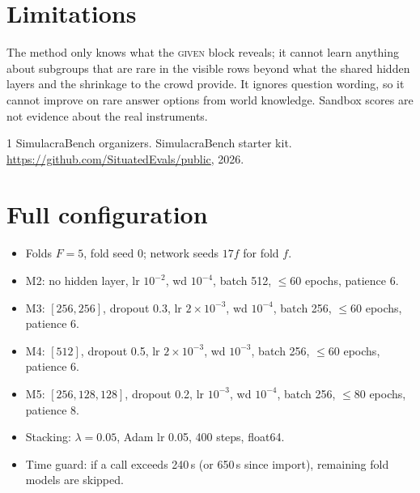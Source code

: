 \documentclass{article}
\begin{document}
\section{Limitations}
\label{sec:limitations}
The method only knows what the \textsc{given} block reveals; it cannot learn anything about subgroups that are rare in the visible rows beyond what the shared hidden layers and the shrinkage to the crowd provide. It ignores question wording, so it cannot improve on rare answer options from world knowledge. Sandbox scores are not evidence about the real instruments.\label{end-of-main}

\begin{thebibliography}{1}
SimulacraBench organizers.
\newblock SimulacraBench starter kit.
\newblock \url{https://github.com/SituatedEvals/public}, 2026.
\end{thebibliography}

\clearpage
\appendix
\section{Full configuration}
\begin{itemize}[leftmargin=*]
  \item Folds $F{=}5$, fold seed 0; network seeds $17f$ for fold $f$.
  \item M2: no hidden layer, lr $10^{-2}$, wd $10^{-4}$, batch 512, $\le$60 epochs, patience 6.
  \item M3: $[256,256]$, dropout 0.3, lr $2\times10^{-3}$, wd $10^{-4}$, batch 256, $\le$60 epochs, patience 6.
  \item M4: $[512]$, dropout 0.5, lr $2\times10^{-3}$, wd $10^{-3}$, batch 256, $\le$60 epochs, patience 6.
  \item M5: $[256,128,128]$, dropout 0.2, lr $10^{-3}$, wd $10^{-4}$, batch 256, $\le$80 epochs, patience 8.
  \item Stacking: $\lambda{=}0.05$, Adam lr 0.05, 400 steps, float64.
  \item Time guard: if a call exceeds 240\,s (or 650\,s since import), remaining fold models are skipped.
\end{itemize}
\end{document}

